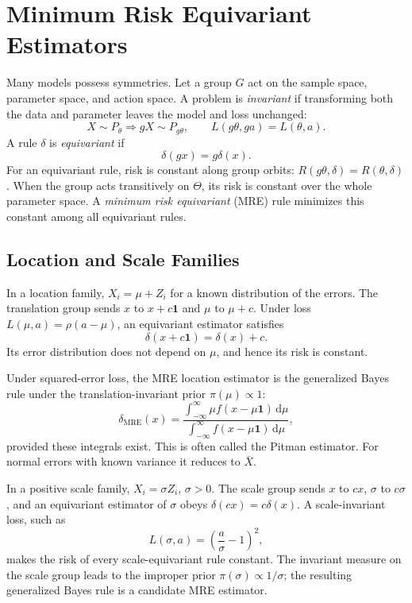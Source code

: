 \documentclass[12pt,oneside]{book}
\numberwithin{equation}{section}
\theoremstyle{definition}
\theoremstyle{plain}
\theoremstyle{remark}
\newcommand{\dd}{\,\mathrm{d}}
\begin{document}
\section{Minimum Risk Equivariant Estimators}

Many models possess symmetries.  Let a group $G$ act on the sample space,
parameter space, and action space.  A problem is \emph{invariant} if
transforming both the data and parameter leaves the model and loss unchanged:
\[
    X\sim P_\theta \Longrightarrow gX\sim P_{g\theta},
    \qquad L(g\theta,ga)=L(\theta,a).
\]
A rule $\delta$ is \emph{equivariant} if
\[
    \delta(gx)=g\delta(x).
\]
For an equivariant rule, risk is constant along group orbits:
$R(g\theta,\delta)=R(\theta,\delta)$.  When the group acts transitively on
$\Theta$, its risk is constant over the whole parameter space.  A
\emph{minimum risk equivariant} (MRE) rule minimizes this constant among all
equivariant rules.

\subsection{Location and Scale Families}

In a location family, $X_i=\mu+Z_i$ for a known distribution of the errors.
The translation group sends $x$ to $x+c\bm 1$ and $\mu$ to $\mu+c$.  Under
loss $L(\mu,a)=\rho(a-\mu)$, an equivariant estimator satisfies
\[
    \delta(x+c\bm 1)=\delta(x)+c.
\]
Its error distribution does not depend on $\mu$, and hence its risk is
constant.

Under squared-error loss, the MRE location estimator is the generalized Bayes
rule under the translation-invariant prior $\pi(\mu)\propto1$:
\begin{equation}
    \delta_{\mathrm{MRE}}(x)
    =\frac{\int_{-\infty}^{\infty}\mu f(x-\mu\bm 1)\dd\mu}
           {\int_{-\infty}^{\infty}f(x-\mu\bm 1)\dd\mu},
    \label{eq:pitman-estimator}
\end{equation}
provided these integrals exist.  This is often called the Pitman estimator.
For normal errors with known variance it reduces to $\bar X$.

In a positive scale family, $X_i=\sigma Z_i$, $\sigma>0$.  The scale group
sends $x$ to $cx$, $\sigma$ to $c\sigma$, and an equivariant estimator of
$\sigma$ obeys $\delta(cx)=c\delta(x)$.  A scale-invariant loss, such as
\[
    L(\sigma,a)=\left(\frac a\sigma-1\right)^2,
\]
makes the risk of every scale-equivariant rule constant.  The invariant
measure on the scale group leads to the improper prior
$\pi(\sigma)\propto1/\sigma$; the resulting generalized Bayes rule is a
candidate MRE estimator.
\end{document}

